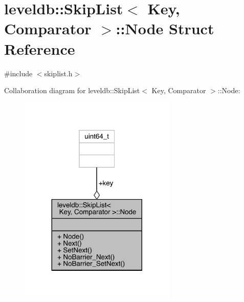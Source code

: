 \hypertarget{structleveldb_1_1_skip_list_1_1_node}{}\section{leveldb\+::Skip\+List$<$ Key, Comparator $>$\+::Node Struct Reference}
\label{structleveldb_1_1_skip_list_1_1_node}


{\ttfamily \#include $<$skiplist.\+h$>$}



Collaboration diagram for leveldb\+::Skip\+List$<$ Key, Comparator $>$\+::Node\+:
\nopagebreak
\begin{figure}[H]
\begin{center}
\leavevmode
\includegraphics[width=212pt]{structleveldb_1_1_skip_list_1_1_node__coll__graph}
\end{center}
\end{figure}
